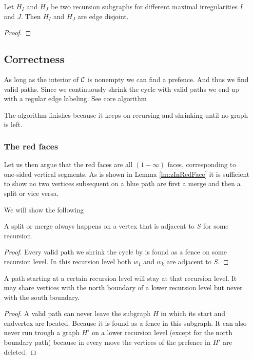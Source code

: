   \begin{lemma}
  Let $H_I$ and $H_J$ be two recursion subgraphs for different maximal irregularities $I$ and $J$. Then $H_I$ and $H_J$ are edge disjoint.
  \end{lemma}
  \begin{proof}
  \end{proof}


\subsection{Correctness}
  As long as the interior of $\mathcal{C}$ is nonempty we can find a prefence. And thus we find valid paths. Since we continuously shrink the cycle with valid paths we end up with a regular edge labeling.
  See core algorithm

  The algorithm finishes because it keeps on recursing and shrinking until no graph is left.

  \subsubsection{The red faces}
  Let us then argue that the red faces are all $(1-\infty)$ faces, corresponding to one-sided vertical segments. As is shown in Lemma \ref{lm:zInRedFace} it is sufficient to show no two vertices subsequent on a blue path are first a merge and then a split or vice versa.

  We will show the following
  \begin{lemma}
    A split or merge always happens on a vertex that is adjacent to $S$ for some recursion.
  \end{lemma}

  \begin{proof}
    Every valid path we shrink the cycle by is found as a fence on some recursion level. In this recursion level both $w_1$ and $w_k$ are adjacent to $S$.
  \end{proof}

  \begin{lemma}
    \label{lm:pathsStayOnRecursionLevel}
    A path starting at a certain recursion level will stay at that recursion level. It may share vertices with the north boundary of a lower recursion level but never with the south boundary.
  \end{lemma}
  \begin{proof}
    A valid path can never leave the subgraph $H$ in which its start and endvertex are located. Because it is found as a fence in this subgraph. It can also never run trough a graph $H'$ on a lower recursion level (except for the north boundary path)  because in every move the vertices of the prefence in $H'$ are deleted.
  \end{proof}

